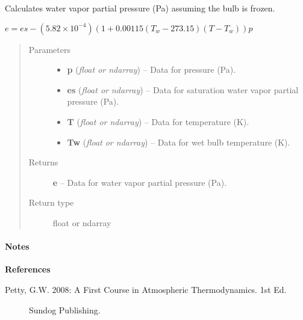 \documentclass[letterpaper,10pt,english]{sphinxmanual}
\begin{document}

\begin{fulllineitems}
\label{atmos:atmos.equations.e_from_p_es_T_Tw_frozen_bulb}
Calculates water vapor partial pressure (Pa) assuming the bulb is frozen.

\(e = es - (5.82 \times 10^{-4}) (1 + 0.00115 (T_w-273.15)  (T-T_w)) p\)
\begin{quote}\begin{description}
\item[{Parameters}] \leavevmode\begin{itemize}
\item {} 
\textbf{p} (\emph{float or ndarray}) -- Data for pressure (Pa).

\item {} 
\textbf{es} (\emph{float or ndarray}) -- Data for saturation water vapor partial pressure (Pa).

\item {} 
\textbf{T} (\emph{float or ndarray}) -- Data for temperature (K).

\item {} 
\textbf{Tw} (\emph{float or ndarray}) -- Data for wet bulb temperature (K).

\end{itemize}

\item[{Returns}] \leavevmode
\textbf{e} --
Data for water vapor partial pressure (Pa).

\item[{Return type}] \leavevmode
float or ndarray

\end{description}\end{quote}
\paragraph{Notes}

\textbf{References}
\begin{description}
\item[{Petty, G.W. 2008: A First Course in Atmospheric Thermodynamics. 1st Ed.}] \leavevmode
Sundog Publishing.

\end{description}

\end{fulllineitems}
\end{document}
